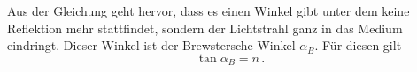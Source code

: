 Aus der Gleichung geht hervor, dass es einen Winkel gibt unter dem keine Reflektion mehr stattfindet, sondern der Lichtstrahl ganz in das Medium eindringt. 
Dieser Winkel ist der Brewstersche Winkel $\alpha_B$. Für diesen gilt
\begin{equation}
    \tan{\alpha_B} = n \, .
    \label{eqn:Brewster}
\end{equation}
